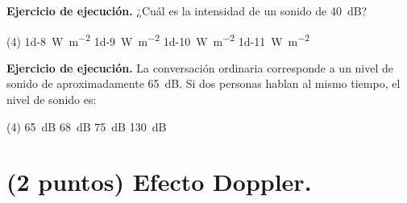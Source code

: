 \documentclass[12pt, letter]{exam}
\begin{document}
\begin{questions}
   \question \label{Ejercicio_02} \textbf{Ejercicio de ejecución.} ¿Cuál es la intensidad de un sonido de \SI{40}{\dB}?
   \begin{tasks}(4)
       \task \SI{1d-8}{\watt\per\square\meter}
       \task \SI{1d-9}{\watt\per\square\meter}
       \task \SI{1d-10}{\watt\per\square\meter}
       \task \SI{1d-11}{\watt\per\square\meter}
   \end{tasks}
   \question \label{Ejercicio_03} \textbf{Ejercicio de ejecución.} La conversación ordinaria corresponde a un nivel de sonido de aproximadamente \SI{65}{\dB}. Si dos personas hablan al mismo tiempo, el nivel de sonido es:
   \begin{tasks}(4)
       \task \SI{65}{\dB}
       \task \SI{68}{\dB}
       \task \SI{75}{\dB}
       \task \SI{130}{\dB}
   \end{tasks}

   \section{(2 puntos) Efecto Doppler.}


\end{questions}
\end{document}
